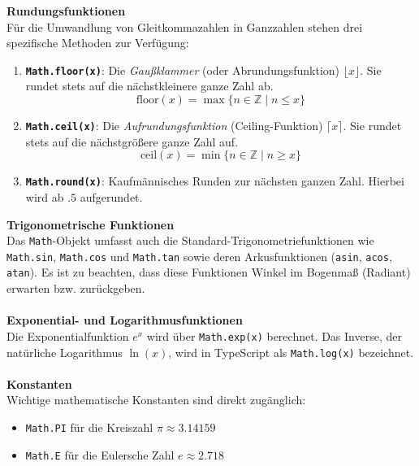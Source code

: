 \textbf{Rundungsfunktionen}\\
Für die Umwandlung von Gleitkommazahlen in Ganzzahlen stehen drei spezifische Methoden zur Verfügung:
\begin{enumerate}
	\item \textbf{\texttt{Math.floor(x)}}: Die \textit{Gaußklammer} (oder Abrundungsfunktion) $\lfloor x \rfloor$. Sie rundet stets auf die nächstkleinere ganze Zahl ab.
	\[ \text{floor}(x) = \max \{ n \in \mathbb{Z} \mid n \le x \} \]
	\item \textbf{\texttt{Math.ceil(x)}}: Die \textit{Aufrundungsfunktion} (Ceiling-Funktion) $\lceil x \rceil$. Sie rundet stets auf die nächstgrößere ganze Zahl auf.
	\[ \text{ceil}(x) = \min \{ n \in \mathbb{Z} \mid n \ge x \} \]
	\item \textbf{\texttt{Math.round(x)}}: Kaufmännisches Runden zur nächsten ganzen Zahl. Hierbei wird ab $.5$ aufgerundet.
\end{enumerate}

\textbf{Trigonometrische Funktionen}\\
Das \texttt{Math}-Objekt umfasst auch die Standard-Trigonometriefunktionen wie \texttt{Math.sin}, \texttt{Math.cos} und \texttt{Math.tan} sowie deren Arkusfunktionen (\texttt{asin}, \texttt{acos}, \texttt{atan}). Es ist zu beachten, dass diese Funktionen Winkel im Bogenmaß (Radiant) erwarten bzw. zurückgeben.\\\\
\textbf{Exponential- und Logarithmusfunktionen}\\
Die Exponentialfunktion $e^x$ wird über \texttt{Math.exp(x)} berechnet. Das Inverse, der natürliche Logarithmus $\ln(x)$, wird in TypeScript als \texttt{Math.log(x)} bezeichnet.\\\\
\textbf{Konstanten}\\
Wichtige mathematische Konstanten sind direkt zugänglich:
\begin{itemize}
	\item \texttt{Math.PI} für die Kreiszahl $\pi \approx 3.14159$
	\item \texttt{Math.E} für die Eulersche Zahl $e \approx 2.718$
\end{itemize}
